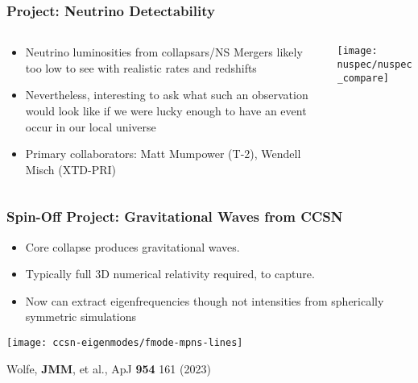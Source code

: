 \documentclass[]{beamer}
\begin{document}
\begin{frame}
  \frametitle{Project: Neutrino Detectability}
  \begin{columns}
    \begin{column}{6cm}
      \begin{itemize}
      \item Neutrino luminosities from collapsars/NS Mergers likely too
        low to see with realistic rates and redshifts
      \item Nevertheless, interesting to ask what such an observation
        would look like if we were lucky enough to have an event occur in
        our local universe
      \item Primary collaborators: Matt Mumpower (T-2), Wendell Misch (XTD-PRI)
      \end{itemize}
    \end{column}
    \begin{column}{6cm}
      \begin{center}
        \texttt{[image: nuspec/nuspec\_compare]}
      \end{center}
    \end{column}
  \end{columns}
\end{frame}

\begin{frame}
  \frametitle{Spin-Off Project: Gravitational Waves from CCSN}
  \begin{itemize}
  \item Core collapse produces gravitational waves.
  \item Typically full 3D numerical relativity required, to capture.
  \item Now can extract eigenfrequencies though not intensities from
    spherically symmetric simulations
  \end{itemize}
  \begin{center}
    \texttt{[image: ccsn-eigenmodes/fmode-mpns-lines]}
  \end{center}
  {\footnotesize Wolfe, \textbf{JMM}, et al., ApJ \textbf{954} 161 (2023)}
\end{frame}
\end{document}
